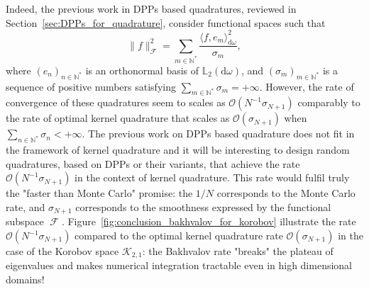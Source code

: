 \documentclass[twoside,11pt]{book}
\numberwithin{theorem}{chapter}
\numberwithin{definition}{chapter}
\numberwithin{proposition}{chapter}
\numberwithin{corollary}{chapter}
\numberwithin{example}{chapter}
\numberwithin{lemma}{chapter}
\numberwithin{assumption}{chapter}
\numberwithin{equation}{chapter}
\numberwithin{figure}{chapter}
\DeclareMathOperator{\F}{\mathcal{F}}
\DeclareMathOperator{\X}{\mathcal{X}}
\begin{document}
Indeed, the previous work in DPPs based quadratures, reviewed in Section~\ref{sec:DPPs_for_quadrature}, consider functional spaces such that  
\begin{equation}
\|f\|_{\F}^{2} = \sum\limits_{m \in \mathbb{N}^{*}} \frac{\langle f,e_{m} \rangle_{\mathrm{d}\omega}^{2}}{\sigma_m},
\end{equation}
where $(e_{n})_{n \in \mathbb{N}^{*}}$ is an orthonormal basis of $\mathbb{L}_{2}(\mathrm{d}\omega)$, and $(\sigma_{m})_{m \in \mathbb{N}^{*}}$ is a sequence of positive numbers satisfying $\sum_{m \in \mathbb{N}^{*}} \sigma_m =+\infty$.
However, the rate of convergence of these quadratures seem to scales as $\mathcal{O}(N^{-1}\sigma_{N+1})$ comparably to the rate of optimal kernel quadrature that scales as $\mathcal{O}(\sigma_{N+1})$ when $\sum_{n \in \mathbb{N}^{*}} \sigma_{n} < +\infty$. The previous work on DPPs based quadrature does not fit in the framework of kernel quadrature and it will be interesting to design random quadratures, based on DPPs or their variants, that achieve the rate $\mathcal{O}(N^{-1}\sigma_{N+1})$ in the context of kernel quadrature. This rate would fulfil truly the "faster than Monte Carlo" promise: the $1/N$ corresponds to the Monte Carlo rate, and $\sigma_{N+1}$ corresponds to the smoothness expressed by the functional subspace $\F$. Figure~\ref{fig:conclusion_bakhvalov_for_korobov} illustrate the rate $\mathcal{O}(N^{-1}\sigma_{N+1})$ compared to the optimal kernel quadrature rate $\mathcal{O}(\sigma_{N+1})$ in the case of the Korobov space $\mathcal{K}_{2,1}$: the Bakhvalov rate "breaks" the plateau of eigenvalues and makes numerical integration tractable even in high dimensional domains! 




\end{document}

